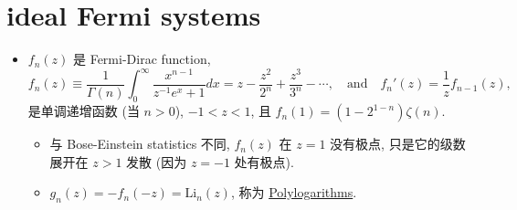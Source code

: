 \chapter{ideal Fermi systems}
\begin{itemize}
	\item $f_n(z)$ 是 Fermi-Dirac function,
	\begin{equation}
		f_n(z) \equiv \frac{1}{\Gamma(n)} \int_0^\infty \frac{x^{n - 1}}{z^{- 1} e^x + 1} dx = z - \frac{z^2}{2^n} + \frac{z^3}{3^n} - \cdots, \quad \text{and} \quad f_n'(z) = \frac{1}{z} f_{n - 1}(z),
	\end{equation}
	是单调递增函数 (当 $n > 0$), $- 1 < z < 1$, 且 $f_n(1) = (1 - 2^{1 - n}) \zeta(n)$.
	\begin{itemize}
		\item 与 Bose-Einstein statistics 不同, $f_n(z)$ 在 $z = 1$ 没有极点, 只是它的级数展开在 $z > 1$ 发散 (因为 $z = - 1$ 处有极点).
		
		\item $g_n(z) = - f_n(- z) = \mathrm{Li}_n(z)$, 称为 \href{https://en.wikipedia.org/wiki/Polylogarithm}{Polylogarithms}.
	\end{itemize}
\end{itemize}


